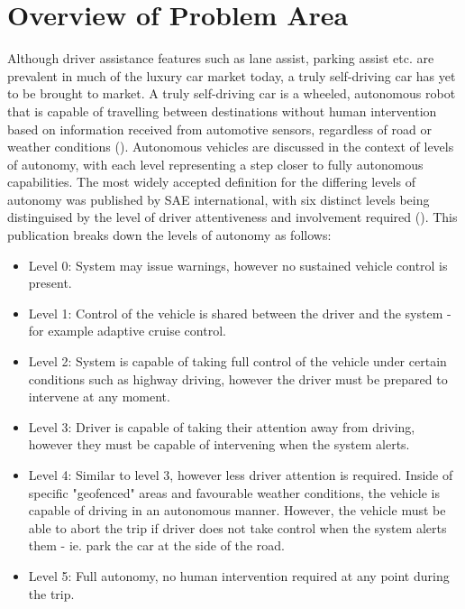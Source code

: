 \documentclass[12pt]{report}
\begin{document}
\section{Overview of Problem Area}
\begin{flushleft}
Although driver assistance features such as lane assist, parking assist etc. are prevalent in much of the luxury car market today, a truly self-driving car has yet to be brought to market. A truly self-driving car is a wheeled, autonomous robot that is capable of travelling between destinations without human intervention based on information received from automotive sensors, regardless of road or weather conditions (\cite{zhao2018key}). Autonomous vehicles are discussed in the context of levels of autonomy, with each level representing a step closer to fully autonomous capabilities. The most widely accepted definition for the differing levels of autonomy was published by SAE international, with six distinct levels being distinguised by the level of driver attentiveness and involvement required (\cite{sae2016taxonomy}). This publication breaks down the levels of autonomy as follows:

\begin{itemize}
\item Level 0: System may issue warnings, however no sustained vehicle control is present.
\item Level 1: Control of the vehicle is shared between the driver and the system - for example adaptive cruise control.
\item Level 2: System is capable of taking full control of the vehicle under certain conditions such as highway driving, however the driver must be prepared to intervene at any moment.
\item Level 3: Driver is capable of taking their attention away from driving, however they must be capable of intervening when the system alerts.
\item Level 4: Similar to level 3, however less driver attention is required. Inside of specific "geofenced" areas and favourable weather conditions, the vehicle is capable of driving in an autonomous manner. However, the vehicle must be able to abort the trip if driver does not take control when the system alerts them - ie. park the car at the side of the road.
\item Level 5: Full autonomy, no human intervention required at any point during the trip.
\end{itemize}
\end{flushleft}
\end{document}
